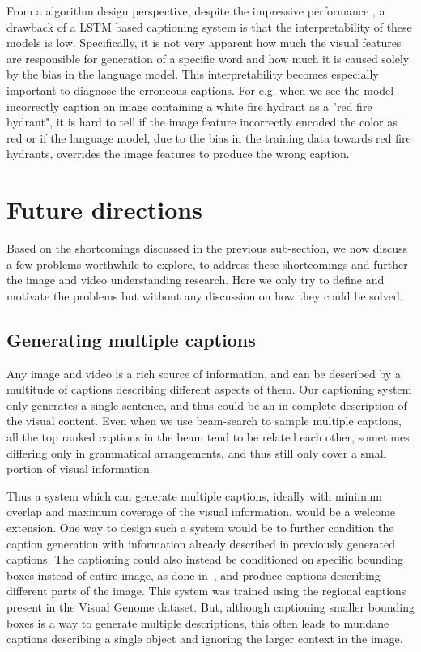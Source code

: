 From a algorithm design perspective, despite the impressive performance , a
drawback of a LSTM based captioning system is that the interpretability of
these models is low.
Specifically, it is not very apparent how much the visual features are
responsible for generation of a specific word and how much it is caused solely
by the bias in the language model.
This interpretability becomes especially important to diagnose the erroneous
captions.
For e.g. when we see the model incorrectly caption an image containing a white
fire hydrant as a "red fire hydrant", it is hard to tell if the image feature
incorrectly encoded the color as red or if the language model, due to the bias
in the training data towards red fire hydrants, overrides the image features to
produce the wrong caption.  

\section{Future directions}
Based on the shortcomings discussed in the previous sub-section, we now discuss
a few problems worthwhile to explore, to address these shortcomings and
further the image and video understanding research.
Here we only try to define and motivate the problems but without any discussion
on how they could be solved.

\subsection{Generating multiple captions}
Any image and video is a rich source of information, and can be described by a
multitude of captions describing different aspects of them. 
Our captioning system only generates a single sentence, and thus could be an
in-complete description of the visual content.
Even when we use beam-search to sample multiple captions, all the top ranked
captions in the beam tend to be related each other, sometimes differing only in
grammatical arrangements, and thus still only cover a small portion of visual
information.

Thus a system which can generate multiple captions, ideally with minimum overlap
and maximum coverage of the visual information, would be a welcome extension.
One way to design such a system would be to further condition the caption
generation with information already described in previously generated captions.
The captioning could also instead be conditioned on specific bounding boxes
instead of entire image, as done in~\cite{johnson2015densecap}, and produce
captions describing different parts of the image.
This system was trained using the regional captions present in the Visual
Genome dataset.
But, although captioning smaller bounding boxes is a way to generate multiple
descriptions, this often leads to mundane captions describing a single object
and ignoring the larger context in the image.

